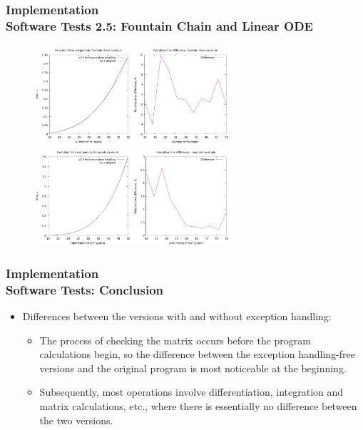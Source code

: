 \documentclass[ucs,10pt]{beamer}
\begin{document}
\begin{frame}
\frametitle{Implementation \\
	\small \color{rwth-blue} Software Tests 2.5: Fountain Chain and Linear ODE}

	\begin{figure}
		\centering
		\includegraphics[width=0.65\textwidth]{figures/2.5_fountain_chain.png}
		\vspace{0.3cm}
		\includegraphics[width=0.65\textwidth]{figures/2.5_linear_ode.png}
	\end{figure}
\end{frame}

\begin{frame}
\frametitle{Implementation \\
	\small \color{rwth-blue} Software Tests: Conclusion}

	\begin{itemize}
		\item Differences between the versions with and without exception handling:
		\begin{itemize}
			\item The process of checking the matrix occurs before the program calculations begin, so the difference between the exception handling-free versions and the original program is most noticeable at the beginning.
			\item Subsequently, most operations involve differentiation, integration and matrix calculations, etc., where there is essentially no difference between the two versions.
		\end{itemize}
	\end{itemize}
\end{frame}
\end{document}
